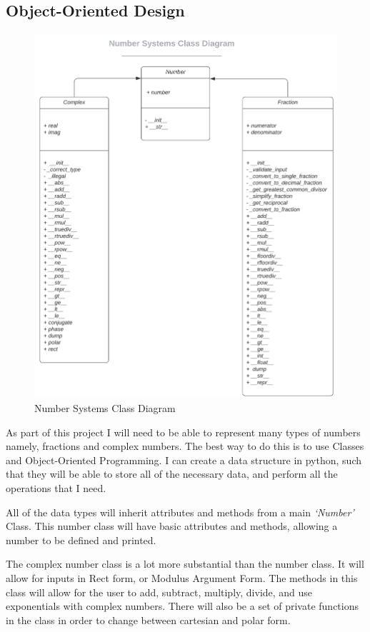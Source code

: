 \documentclass{article}
\begin{document}
\subsection{Object-Oriented Design}
\begin{figure}[h]
    \centering
    \captionsetup{justification=centering}
    \includegraphics[scale=0.6]{number-systems-class-diagram}
    \caption{Number Systems Class Diagram}
\end{figure}
As part of this project I will need to be able to represent many types of numbers namely, fractions and complex numbers. The best way to do this is to use Classes and Object-Oriented Programming. I can create a data structure in python, such that they will be able to store all of the necessary data, and perform all the operations that I need.

All of the data types will inherit attributes and methods from a main \textit{‘Number’} Class. This number class will have basic attributes and methods, allowing a number to be defined and printed.

The complex number class is a lot more substantial than the number class.  It will allow for inputs in Rect form, or Modulus Argument Form. The methods in this class will allow for the user to add, subtract, multiply, divide, and use exponentials with complex numbers. There will also be a set of private functions in the class in order to change between cartesian and polar form.
\end{document}
